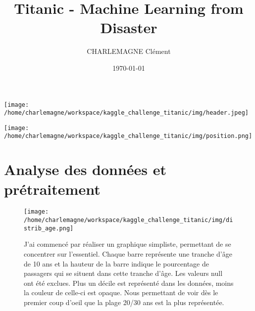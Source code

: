 \documentclass[9pt]{article}
\title{Titanic - Machine Learning from Disaster}
\author{CHARLEMAGNE Clément}
\date{\today}
\begin{document}
\maketitle

\begin{center}
    \texttt{[image: /home/charlemagne/workspace/kaggle\_challenge\_titanic/img/header.jpeg]}
\end{center}

\vspace*{100pt}

\begin{center}
    \texttt{[image: /home/charlemagne/workspace/kaggle\_challenge\_titanic/img/position.png]}
\end{center}

\clearpage
\section{\textcolor{section}{Analyse des données et prétraitement}}

\begin{figure}[htbp]
    \centering
    \begin{minipage}{0.45\textwidth}
        \centering
        \texttt{[image: /home/charlemagne/workspace/kaggle\_challenge\_titanic/img/distrib\_age.png]}
    \end{minipage}\hfill
    \begin{minipage}{0.45\textwidth}
        J'ai commencé par réaliser un graphique simpliste, permettant de se concentrer sur l'essentiel.
         Chaque barre représente une tranche d'âge de 10 ans et la hauteur de la barre indique le pourcentage 
         de passagers qui se situent dans cette tranche d'âge. Les valeurs null ont été exclues. Plus un décile
          est représenté dans les données, moins la couleur de celle-ci est opaque. Nous permettant de voir dès 
          le premier coup d'oeil que la plage 20/30 ans est la plus représentée.
    \end{minipage}
\end{figure}
\end{document}
